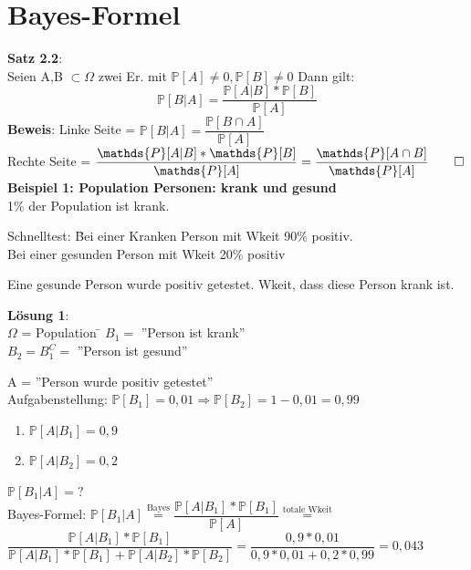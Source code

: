  \section{Bayes-Formel}
\textbf{Satz 2.2}:\\
Seien A,B $\subset \Omega$ zwei Er. mit $\mathds{P}[A] \neq 0, \mathds{P}[B] \neq 0$ Dann gilt:
$$\mathds{P}[B \vert A] = \dfrac{\mathds{P}[A\vert B] * \mathds{P}[B]}{\mathds{P}[A]}$$
\textbf{Beweis}: Linke Seite = $\mathds{P}[B\vert A] = \dfrac{\mathds{P}[B \cap A]}{\mathds{P}[A]}$\smallskip\\
Rechte Seite = $\dfrac{\mathds{P}[A \vert B] * \mathds{P}[B]}{\mathds{P}[A]} = \dfrac{\mathds{P}[A \cap B]}{\mathds{P}[A]} \qed$\medskip\\
\textbf{Beispiel 1: Population Personen: krank und gesund}\\
1\% der Population ist krank.\medskip\\
\begin{tabbing}
	Schnelltest: \= Bei einer Kranken Person mit Wkeit 90\% positiv.\\
	\> Bei einer gesunden Person mit Wkeit 20\% positiv
\end{tabbing}
Eine gesunde Person wurde positiv getestet. Wkeit, dass diese Person krank ist.\smallskip\\
\begin{tabbing}
\textbf{Lösung 1}:\\ $\Omega$ = Population \hspace{1cm} \= $B_1 = $ ''Person ist krank''\\
\> $B_2 = B_1^C = $ ''Person ist gesund''
\end{tabbing}
A = ''Person wurde positiv getestet''\\
Aufgabenstellung: $\mathds{P}[B_1] = 0,01 \Rightarrow \mathds{P}[B_2] = 1-0,01=0,99$
\begin{enumerate}
	\item $\mathds{P}[A \vert B_1] = 0,9$
	\item $\mathds{P}[A \vert B_2] = 0,2$
\end{enumerate}
$\mathds{P}[B_1\vert A] = ?$\\
Bayes-Formel: $\mathds{P}[B_1 \vert A] \overset{\text{Bayes}}{=} \dfrac{\mathds{P}[A\vert B_1] * \mathds{P}[B_1]}{\mathds{P}[A]} \overset{\text{totale Wkeit}}{=} $\smallskip\\$
\dfrac{\mathds{P}[A \vert B_1]*\mathds{P}[B_1]}{\mathds{P}[A \vert B_1]*\mathds{P}[B_1]+\mathds{P}[A\vert B_2]*\mathds{P}[B_2]} = \dfrac{0,9*0,01}{0,9*0,01+0,2*0,99}= 0,043$\medskip\\
